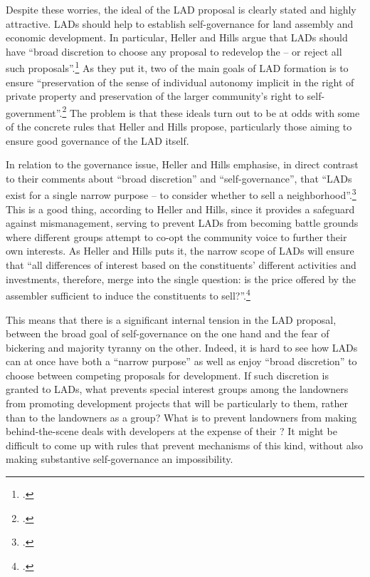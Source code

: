 Despite these worries, the ideal of the LAD proposal is clearly stated and highly attractive. LADs should help to establish self-governance for land assembly and economic development. In particular, Heller and Hills argue that LADs should have ``broad discretion to choose any proposal to redevelop the  -- or reject all such proposals''.\footcite[See][1496]{heller08} As they put it, two of the main goals of LAD formation is to ensure ``preservation of the sense of individual autonomy implicit in the right of private property and preservation of the larger community's right to self-government''.\footcite[See][1498]{heller08} The problem is that these ideals turn out to be at odds with some of the concrete rules that Heller and Hills propose, particularly those aiming to ensure good governance of the LAD itself.


In relation to the governance issue, Heller and Hills emphasise, in direct contrast to their comments about ``broad discretion'' and ``self-governance'', that ``LADs exist for a single narrow purpose -- to consider whether to sell a neighborhood''.\footcite[See][1500]{heller08} This is a good thing, according to Heller and Hills, since it provides a safeguard against mismanagement, serving to prevent LADs from becoming battle grounds where different groups attempt to co-opt the community voice to further their own interests. As Heller and Hills puts it, the narrow scope of LADs will ensure that ``all differences of interest based on the constituents' different activities and investments, therefore, merge into the single question: is the price offered by the assembler sufficient to induce the constituents to sell?''.\footcite[1500]{heller08}

This means that there is a significant internal tension in the LAD proposal, between the broad goal of self-governance on the one hand and the fear of  bickering and majority tyranny on the other. Indeed, it is hard to see how LADs can at once have both a ``narrow purpose'' as well as enjoy ``broad discretion'' to choose between competing proposals for development. If such discretion is granted to LADs, what prevents special interest groups among the landowners from promoting development projects that will be particularly  to them, rather than to the landowners as a group? What is to prevent landowners from making behind-the-scene deals with  developers at the expense of their ? It might be difficult to come up with rules that prevent mechanisms of this kind, without also making substantive self-governance an impossibility.

